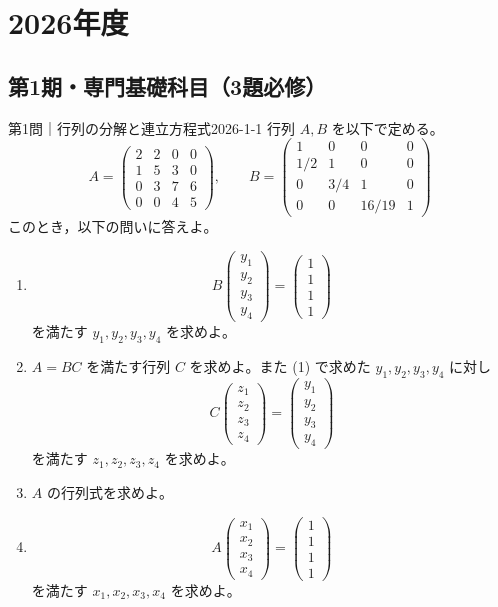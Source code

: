 \chapter{2026年度}
\label{ch:2026}

\section{第1期・専門基礎科目（3題必修）}

\begin{problem}{第1問｜行列の分解と連立方程式}{2026-1-1}
行列 $A,B$ を以下で定める。
\[
A=\begin{pmatrix}
2&2&0&0\\
1&5&3&0\\
0&3&7&6\\
0&0&4&5
\end{pmatrix},\qquad
B=\begin{pmatrix}
1&0&0&0\\
1/2&1&0&0\\
0&3/4&1&0\\
0&0&16/19&1
\end{pmatrix}
\]
このとき，以下の問いに答えよ。
\begin{enumerate}
  \item[(1)]
  \[
  B\begin{pmatrix}y_1\\y_2\\y_3\\y_4\end{pmatrix}
  =\begin{pmatrix}1\\1\\1\\1\end{pmatrix}
  \]
  を満たす $y_1,y_2,y_3,y_4$ を求めよ。
  \item[(2)] $A=BC$ を満たす行列 $C$ を求めよ。また (1) で求めた $y_1,y_2,y_3,y_4$ に対し
  \[
  C\begin{pmatrix}z_1\\z_2\\z_3\\z_4\end{pmatrix}
  =\begin{pmatrix}y_1\\y_2\\y_3\\y_4\end{pmatrix}
  \]
  を満たす $z_1,z_2,z_3,z_4$ を求めよ。
  \item[(3)] $A$ の行列式を求めよ。
  \item[(4)]
  \[
  A\begin{pmatrix}x_1\\x_2\\x_3\\x_4\end{pmatrix}
  =\begin{pmatrix}1\\1\\1\\1\end{pmatrix}
  \]
  を満たす $x_1,x_2,x_3,x_4$ を求めよ。
\end{enumerate}
\end{problem}
